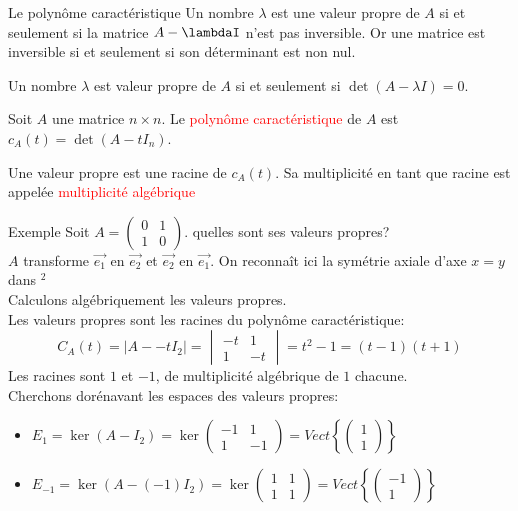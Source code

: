 \begin{parag}{Le polynôme caractéristique}
    Un nombre $\lambda$ est une valeur propre de $A$ si et seulement si la matrice $A - \lambdaI$ n'est pas inversible. Or une matrice est inversible si et seulement si son déterminant est non nul.
    \begin{theoreme}
        Un nombre $\lambda$ est valeur propre de $A$ si et seulement si $\det (A - \lambda I) = 0$.
    \end{theoreme}
    \begin{definition}
        Soit $A$ une matrice $n \times n$. Le \textcolor{red}{polynôme caractéristique} de $A$ est $c_A(t) = \det(A - tI_n)$.
    \end{definition}
    Une valeur propre est une racine de $c_A(t)$. Sa multiplicité en tant que racine est appelée \textcolor{red}{multiplicité algébrique}


    \begin{subparag}{Exemple}
        Soit $A = \begin{pmatrix}
            0 & 1 \\ 1 & 0
        \end{pmatrix}$. quelles sont ses valeurs propres?
        \\
        $A$ transforme $\vec{e_1}$ en $\vec{e_2}$ et $\vec{e_2}$ en $\vec{e_1}$. On reconnaît ici la symétrie axiale d'axe $x = y$ dans \R$^2$\\
        Calculons algébriquement les valeurs propres.
        \\
        Les valeurs propres sont les racines du polynôme caractéristique:
        \[C_A(t) = |A - -tI_2| = \begin{vmatrix}
            -t & 1 \\ 1 & -t
        \end{vmatrix} = t^2 -1 = (t-1)(t+1)\]
        Les racines sont $1$ et $-1$, de multiplicité algébrique de $1$ chacune.\\
        Cherchons dorénavant les espaces des valeurs propres:
        \begin{itemize}
            \item $E_1 = \ker(A - I_2) = \ker \begin{pmatrix}
                -1 & 1 \\ 1 & -1
            \end{pmatrix} = Vect\left\{\begin{pmatrix}
                1 \\ 1
            \end{pmatrix}\right\}$
            \item $E_{-1} = \ker(A - (-1)I_2) = \ker \begin{pmatrix}
                1 & 1 \\ 1 & 1
            \end{pmatrix} = Vect\left\{\begin{pmatrix}
                -1 \\ 1
            \end{pmatrix}\right\}$
            

\end{itemize}
\end{subparag}
\end{parag}

